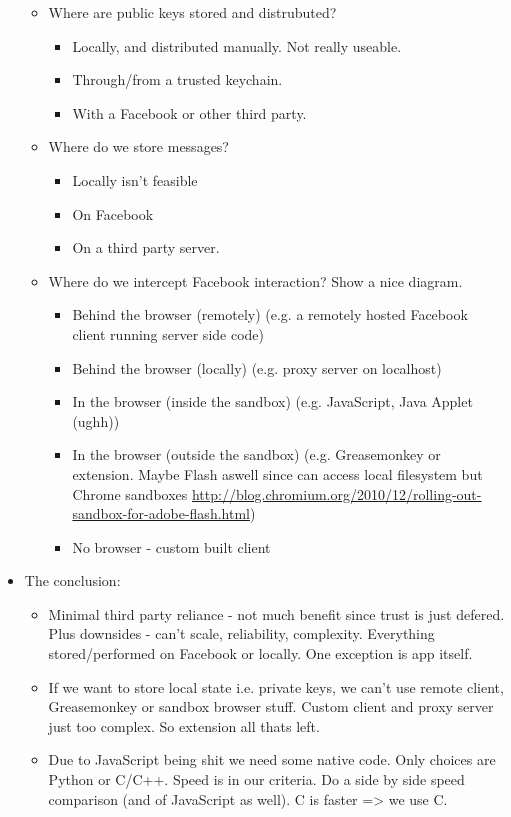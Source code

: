 \begin{itemize}
\begin{itemize}
        \item Where are public keys stored and distrubuted?
            \begin{itemize}
                \item Locally, and distributed manually. Not really useable.
                \item Through/from a trusted keychain.
                \item With a Facebook or other third party.
            \end{itemize}
                
        \item Where do we store messages?
            \begin{itemize}
                \item Locally isn't feasible
                \item On Facebook
                \item On a third party server.
            \end{itemize}
                
        \item Where do we intercept Facebook interaction? Show a nice diagram.
            \begin{itemize}
                \item Behind the browser (remotely) (e.g. a remotely hosted Facebook client running server side code)
                \item Behind the browser (locally) (e.g. proxy server on localhost)
                \item In the browser (inside the sandbox) (e.g. JavaScript, Java Applet (ughh))
                \item In the browser (outside the sandbox) (e.g. Greasemonkey or extension. Maybe Flash aswell since can access local filesystem but Chrome sandboxes \url{http://blog.chromium.org/2010/12/rolling-out-sandbox-for-adobe-flash.html})
                \item No browser - custom built client
            \end{itemize}
        \end{itemize}
        
	\item The conclusion:
            \begin{itemize}
                \item Minimal third party reliance - not much benefit since trust is just defered. Plus downsides - can't scale, reliability, complexity. Everything stored/performed on Facebook or locally. One exception is app itself.
                \item If we want to store local state i.e. private keys, we can't use remote client, Greasemonkey or sandbox browser stuff. Custom client and proxy server just too complex. So extension all thats left.
                \item Due to JavaScript being shit we need some native code. Only choices are Python or C/C++. Speed is in our criteria. Do a side by side speed comparison (and of JavaScript as well). C is faster => we use C.
            \end{itemize}
        

\end{itemize}

